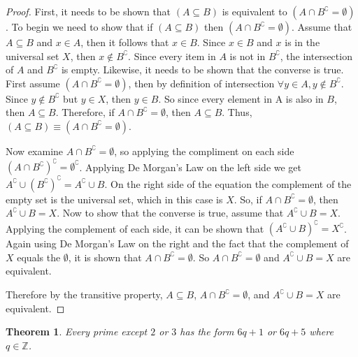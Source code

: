 \documentclass{article}
\newtheorem{theorem}{Theorem}
\begin{document}
\begin{proof}    
    First, it needs to be shown that $(A \subseteq B)$ is equivalent to $(A \cap B^\complement = \emptyset)$. To begin we need to show that if $(A \subseteq B)$ then $(A \cap B^\complement = \emptyset)$.  Assume that $A \subseteq B$ and $x \in A$, then it follows that $x \in B$. Since $x\in B$ and $x$ is in the universal set $X$, then $x \notin B^\complement$. Since every item in $A$  is not in $B^\complement$, the intersection of  $A$ and $B^\complement$ is empty.
    Likewise, it needs to be shown that the converse is true. First assume $(A \cap B^\complement = \emptyset)$, then by definition of intersection $\forall y\in A, y \notin B^\complement$. Since $y \notin B^\complement$ but $y \in X$, then $y\in B$. So since every element in A is also in $B$, then $A\subseteq B$. Therefore, if $A\cap B^\complement = \emptyset$, then $A\subseteq B$.
    Thus, $(A \subseteq B) \equiv (A \cap B^\complement = \emptyset)$.
    
    Now examine $A \cap B^\complement = \emptyset$, so applying the compliment on each side $(A \cap B^\complement)^\complement = \emptyset^\complement$. Applying De Morgan's Law on the left side we get $A^\complement \cup    (B^\complement)^\complement =  A^\complement \cup B$. On the right side of the equation the complement of the empty set is the universal set, which in this case is $X$. So, if $A \cap B^\complement = \emptyset$, then $A^\complement \cup B = X$.
    Now to show that the converse is true, assume that $A^\complement \cup B = X$. Applying the complement of each side, it can be shown that $(A^\complement \cup B)^\complement = X^\complement$. Again using De Morgan's Law on the right and the fact that the complement of $X$ equals the $\emptyset$, it is shown that $A \cap B^\complement = \emptyset$. So $A \cap B^\complement = \emptyset$ and $A^\complement \cup B = X$ are equivalent.

    Therefore by the transitive property, $A \subseteq B$, $A \cap B^\complement = \emptyset$, and $A^\complement \cup B = X$ are equivalent.
\end{proof}
\pagebreak

\begin{theorem}
  Every prime except $2$ or $3$ has the form $6q+1$ or $6q +5$ where $q\in \mathbb{Z}$.
\end{theorem}
\end{document}
